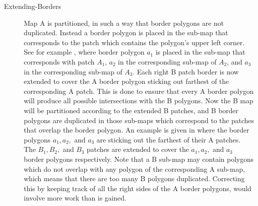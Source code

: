 \begin{description}
  \item[Extending-Borders]
    Map A is partitioned, in such a way that border polygons are not
    duplicated.
    Instead a border polygon is placed in the sub-map that corresponds
    to the patch which contains the polygon's upper left corner.
    See for example 
    , where border
    polygon $a_{1}$ is placed in the sub-map that corresponds with
    patch $A_{1}$, $a_{2}$ in the corresponding sub-map of $A_{2}$,
    and $a_{3}$ in the corresponding sub-map of $A_{3}$.
    Each right B patch border is now extended to cover the A border
    polygon sticking out farthest of the corresponding A patch.
    This is done to ensure that every A border polygon will produce
    all possible intersections with the B polygons.
    Now the B map will be partitioned according to the extended B
    patches, and B border polygons are duplicated in those sub-maps
    which correspond to the patches that overlap the border polygon.
    An example is given in
     where the border
    polygons $a_{1}, a_{2},$ and $a_{3}$ are sticking out the farthest of
    their A patches. The $B_{1}, B_{2},$ and $B_{3}$ patches are
    extended to cover the $a_{1}, a_{2},$ and $a_{3}$ border polygons
    respectively.
    Note that a B sub-map may contain polygons which do not overlap
    with any polygon of the corresponding A sub-map, which means that
    there are too many B polygons duplicated.
    Correcting this by keeping track of all the right sides of
    the A border polygons, would involve more work than is gained.

    \vspace*{-0.4cm}
    \begin{figure}[hbt]
      \begin{centering}
        \hspace*{1cm}
        \hspace*{-1cm}
        \hspace*{-0.5cm}
      \end{centering}
      \vspace{-0.8cm}
    \end{figure}


\end{description}
